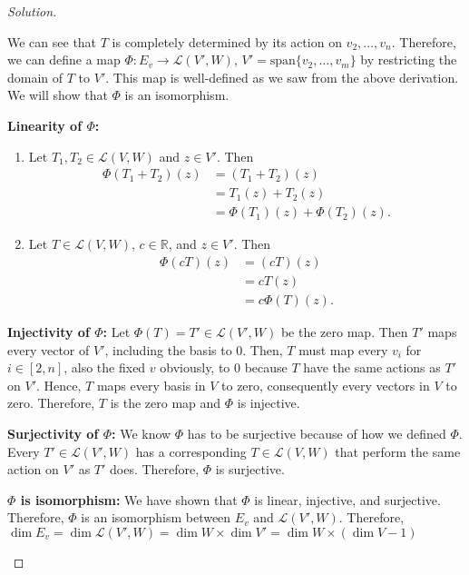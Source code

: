 \documentclass{article}
\begin{document}
\begin{proof}[Solution]
\begin{enumerate}[label=(\alph*)]
        We can see that $T$ is completely determined by its action on $v_2, \dots, v_n$. Therefore, 
        we can define a map $\Phi:E_v\to\mathcal{L}(V',W)$, 
        $V'=\mathrm{span}\{v_2,\dots,v_m\}$ by restricting the domain of $T$ to 
        $V'$. This map is well-defined as we saw from the above derivation.
        We will show that $\Phi$ is an isomorphism.

        \textbf{Linearity of $\Phi$:}
        \begin{enumerate}[label=(\roman*)]
            \item 
            Let $T_1, T_2\in\mathcal{L}(V,W)$ and $z\in V'$. Then
            \begin{align*}
                \Phi(T_1+T_2)(z) & = (T_1+T_2)(z) \\
                & = T_1(z) + T_2(z) \\
                & = \Phi(T_1)(z) + \Phi(T_2)(z).
            \end{align*}

            \item 
            Let $T\in\mathcal{L}(V,W)$, $c\in\mathbb{R}$, and $z\in V'$. Then
            \begin{align*}
                \Phi(cT)(z) & = (cT)(z) \\
                & = cT(z) \\
                & = c\Phi(T)(z).
            \end{align*}
        \end{enumerate}

        \textbf{Injectivity of $\Phi$:} Let $\Phi(T)=T'\in\mathcal{L}(V',W)$ be the zero map. Then 
        $T'$ maps every vector of $V'$, including the basis to 0. Then, $T$ must map every $v_i$ for 
        $i\in[2,n]$, also the fixed $v$ obviously, to 0 because $T$ have the same actions as $T'$ on 
        $V'$. 
        Hence, $T$ maps every basis in $V$ to zero, consequently every vectors in $V$ to zero. 
        Therefore, $T$ is the zero map and $\Phi$ is injective.

        \textbf{Surjectivity of $\Phi$:} We know $\Phi$ has to be surjective because of how we 
        defined $\Phi$. Every $T'\in \mathcal{L}(V',W)$ has a corresponding $T\in\mathcal{L}(V,W)$ 
        that perform the same action on $V'$ as $T'$ does. Therefore, $\Phi$ is surjective.

        \textbf{$\Phi$ is isomorphism:} We have shown that $\Phi$ is linear, injective, and 
        surjective. Therefore, $\Phi$ is an isomorphism between $E_v$ and $\mathcal{L}(V',W)$. 
        Therefore, $\dim E_v = \dim \mathcal{L}(V',W)=\dim W \times \dim V' = \dim W \times 
        (\dim V - 1)$
        
    \end{enumerate}
\end{proof}
\end{document}
